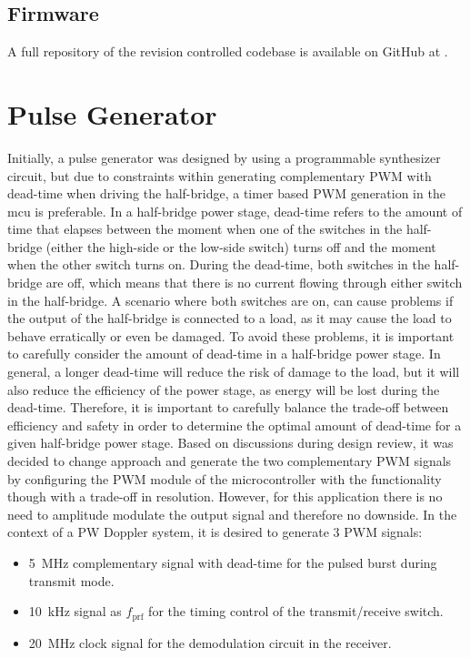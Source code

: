 \subsection{Firmware}
A full repository of the revision controlled codebase is available on GitHub at \cite{github_firmware}.

\section{Pulse Generator}
Initially, a pulse generator was designed by using a programmable synthesizer circuit, but due to constraints within generating complementary PWM with dead-time when driving the half-bridge, a timer based PWM generation in the \gls{mcu} is preferable. In a half-bridge power stage, dead-time refers to the amount of time that elapses between the moment when one of the switches in the half-bridge (either the high-side or the low-side switch) turns off and the moment when the other switch turns on. During the dead-time, both switches in the half-bridge are off, which means that there is no current flowing through either switch in the half-bridge. A scenario where both switches are on, can cause problems if the output of the half-bridge is connected to a load, as it may cause the load to behave erratically or even be damaged. To avoid these problems, it is important to carefully consider the amount of dead-time in a half-bridge power stage. In general, a longer dead-time will reduce the risk of damage to the load, but it will also reduce the efficiency of the power stage, as energy will be lost during the dead-time. Therefore, it is important to carefully balance the trade-off between efficiency and safety in order to determine the optimal amount of dead-time for a given half-bridge power stage. Based on discussions during design review, it was decided to change approach and generate the two complementary PWM signals by configuring the PWM module of the microcontroller with the functionality though with a trade-off in resolution. However, for this application there is no need to amplitude modulate the output signal and therefore no downside.
In the context of a PW Doppler system, it is desired to generate 3 PWM signals:
\begin{itemize}
	\item \qty{5}{\mega\hertz} complementary signal with dead-time for the pulsed burst during transmit mode.
	\item \qty{10}{\kilo\hertz} signal as $f_{\mathrm{prf}}$ for the timing control of the transmit/receive switch.
	\item \qty{20}{\mega\hertz} clock signal for the demodulation circuit in the receiver.
\end{itemize}

